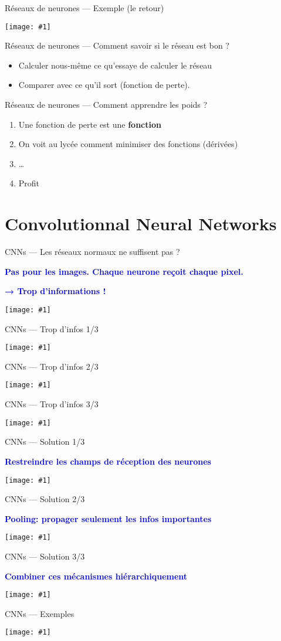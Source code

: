 \documentclass{beamer}
\newcommand\blue[1]{\textcolor{blue}{#1}}
\newcommand\cimg[1]{\vfill\centerline{\texttt{[image: \#1]}}\vfill}
\newcommand\cimgg[1]{\vfill\centerline{\texttt{[image: \#1]}}\vfill}
\newcommand\cimggg[1]{\vfill\centerline{\texttt{[image: \#1]}}\vfill}
\newcommand\vphrase[1]{\vfill\centerline{\large\bf\blue{#1}}\vfill}
\begin{document}
\begin{frame}{Réseaux de neurones --- Exemple (le retour)}
  \cimgg{neural-network.png}
\end{frame}

\begin{frame}{Réseaux de neurones --- Comment savoir si le réseau est
    bon ?}
  \begin{itemize}
  \item Calculer nous-même ce qu'essaye de calculer le réseau
  \item Comparer avec ce qu'il sort (fonction de perte).
  \end{itemize}
\end{frame}

\begin{frame}{Réseaux de neurones --- Comment apprendre les poids ?}
  \begin{enumerate}
  \item Une fonction de perte est une \textbf{fonction}
  \item On voit au lycée comment minimiser des fonctions (dérivées)
  \item …
  \item Profit
  \end{enumerate}
\end{frame}

\section{Convolutionnal Neural Networks}
\label{sec:convnets}
\begin{frame}{CNNs --- Les réseaux normaux ne suffisent pas ?}
  \vphrase{Pas pour les images. Chaque neurone reçoit chaque pixel.}
  \vphrase{→ Trop d'informations !}
  \vfill
  \cimgg{tmi.jpg}
  \vfill
\end{frame}
\begin{frame}{CNNs --- Trop d'infos 1/3}
  \cimgg{park.jpg}
\end{frame}
\begin{frame}{CNNs --- Trop d'infos 2/3}
  \cimgg{station.jpg}
\end{frame}
\begin{frame}{CNNs --- Trop d'infos 3/3}
  \cimgg{street.jpg}
\end{frame}
\begin{frame}{CNNs --- Solution 1/3}
  \vphrase{Restreindre les champs de réception des neurones}
  \cimggg{kernel.jpg}
\end{frame}
\begin{frame}{CNNs --- Solution 2/3}
  \vphrase{Pooling: propager seulement les infos importantes}
  \cimg{pooling.png}
\end{frame}
\begin{frame}{CNNs --- Solution 3/3}
  \vphrase{Combiner ces mécanismes hiérarchiquement}
  \cimg{cnn.jpg}
\end{frame}
\begin{frame}{CNNs --- Exemples}
  \cimg{hierarchical-features.png}
\end{frame}
\end{document}
